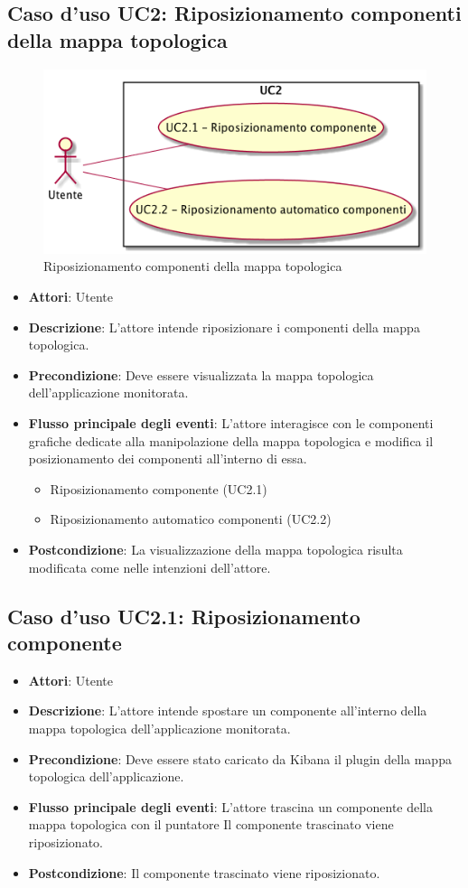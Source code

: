 \subsection{Caso d'uso UC2: Riposizionamento componenti della mappa topologica}
\begin{figure} [H]
	\centering
	\includegraphics[scale=0.45]{./UC/UC2.png}
	\caption{Riposizionamento componenti della mappa topologica}\label{}
\end{figure}
\begin{itemize}
	\item \textbf{Attori}: Utente
	\item \textbf{Descrizione}: L'attore intende riposizionare i componenti della mappa topologica.
	\item \textbf{Precondizione}: Deve essere visualizzata la mappa topologica dell'applicazione monitorata.
	\item \textbf{Flusso principale degli eventi}: L'attore interagisce con le componenti grafiche dedicate alla manipolazione della mappa topologica e modifica il posizionamento dei componenti all'interno di essa.
	\begin{itemize}
		\item Riposizionamento componente (UC2.1)
		\item Riposizionamento automatico componenti (UC2.2)
	\end{itemize}
	\item \textbf{Postcondizione}: La visualizzazione della mappa topologica risulta modificata come nelle intenzioni dell'attore.
\end{itemize}
\subsection{Caso d'uso UC2.1: Riposizionamento componente}
\begin{itemize}
	\item \textbf{Attori}: Utente
	\item \textbf{Descrizione}: L'attore intende spostare un componente all'interno della mappa topologica dell'applicazione monitorata.
	\item \textbf{Precondizione}: Deve essere stato caricato da Kibana il plugin della mappa topologica dell'applicazione.
	\item \textbf{Flusso principale degli eventi}: L'attore trascina un componente della mappa topologica con il puntatore Il componente trascinato viene riposizionato.
	\item \textbf{Postcondizione}: Il componente trascinato viene riposizionato.
\end{itemize}
